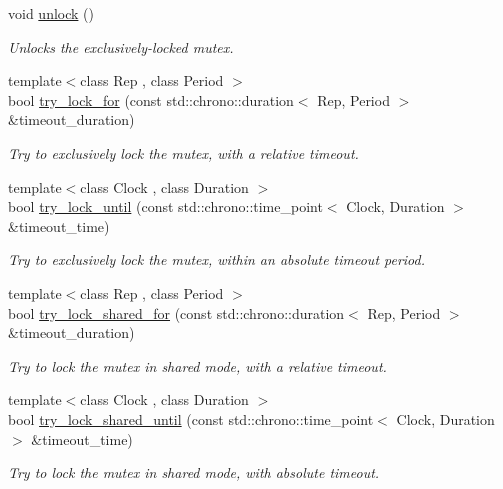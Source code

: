 \begin{DoxyCompactItemize}
void \hyperlink{classcpen333_1_1thread_1_1impl_1_1shared__mutex__fair_a5c8440694cb8d3fe3d798dbcc6659495}{unlock} ()
\begin{DoxyCompactList}\small\item\em Unlocks the exclusively-\/locked mutex. \end{DoxyCompactList}\item 
{\footnotesize template$<$class Rep , class Period $>$ }\\bool \hyperlink{classcpen333_1_1thread_1_1impl_1_1shared__mutex__fair_acc5fb14c1943ba33011f9c7e8562c4a9}{try\+\_\+lock\+\_\+for} (const std\+::chrono\+::duration$<$ Rep, Period $>$ \&timeout\+\_\+duration)
\begin{DoxyCompactList}\small\item\em Try to exclusively lock the mutex, with a relative timeout. \end{DoxyCompactList}\item 
{\footnotesize template$<$class Clock , class Duration $>$ }\\bool \hyperlink{classcpen333_1_1thread_1_1impl_1_1shared__mutex__fair_a4780ae180ff8f0d4a69d56f4f1095b78}{try\+\_\+lock\+\_\+until} (const std\+::chrono\+::time\+\_\+point$<$ Clock, Duration $>$ \&timeout\+\_\+time)
\begin{DoxyCompactList}\small\item\em Try to exclusively lock the mutex, within an absolute timeout period. \end{DoxyCompactList}\item 
{\footnotesize template$<$class Rep , class Period $>$ }\\bool \hyperlink{classcpen333_1_1thread_1_1impl_1_1shared__mutex__fair_a3cc8d50bd79ee83b370f717674eb3093}{try\+\_\+lock\+\_\+shared\+\_\+for} (const std\+::chrono\+::duration$<$ Rep, Period $>$ \&timeout\+\_\+duration)
\begin{DoxyCompactList}\small\item\em Try to lock the mutex in shared mode, with a relative timeout. \end{DoxyCompactList}\item 
{\footnotesize template$<$class Clock , class Duration $>$ }\\bool \hyperlink{classcpen333_1_1thread_1_1impl_1_1shared__mutex__fair_a13082f2a4d6c63b3a9c6b288a0259252}{try\+\_\+lock\+\_\+shared\+\_\+until} (const std\+::chrono\+::time\+\_\+point$<$ Clock, Duration $>$ \&timeout\+\_\+time)
\begin{DoxyCompactList}\small\item\em Try to lock the mutex in shared mode, with absolute timeout. \end{DoxyCompactList}\end{DoxyCompactItemize}


